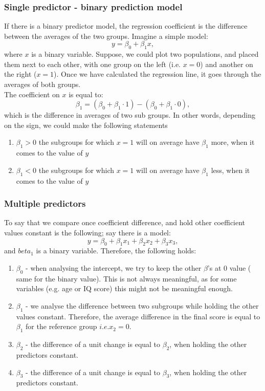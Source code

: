 \documentclass{article}
\begin{document}
\subsubsection*{Single predictor - binary prediction model}
If there is a binary predictor model, the regression coefficient is the difference between the averages of the two groups. Imagine a simple model:
\begin{equation}
y = \beta_0 + \beta_1x,
\end{equation}
\indent
 where $x$ is a binary variable. Suppose, we could plot two populations, and placed them next to each other,  with one group on the left (i.e. $x=0$) and another on the right ($x=1$). Once we have calculated the regression line, it goes through the averages of both groups.
\\
The coefficient on $x$ is equal to:
\begin{equation}
\beta_1 = (\beta_0 + \beta_1 \cdot 1) - (\beta_0 + \beta_1 \cdot 0),
\end{equation}
\indent
 which is the difference in averages of two sub groups. In other words, depending on the sign, we could make the following statements
\begin{enumerate}
\item $\beta_1 > 0$ the subgroups for which $x=1$ will on average have $\beta_1$ more, when it comes to the value of $y$
\item $\beta_1 <0$ the subgroups for which $x=1$ will on average have $\beta_1$ less, when it comes to the value of $y$
\end{enumerate}

\subsubsection*{Multiple predictors}
To say that we compare once coefficient difference, and hold other coefficient values constant is the following; say there is a model:
\begin{equation}
y = \beta_0 + \beta_1x_1 + \beta_2x_2 + \beta_3x_3 ,
\end{equation}
\indent
and $beta_1$ is a binary variable. Therefore, the following holds:
\begin{enumerate}
\item $\beta_0$ - when analysing the intercept, we try to keep the other $\beta$'s at 0 value ( same for the binary value). This is not always meaningful, as for some variables (e.g. age or IQ score) this might not be meaningful enough.
\item $\beta_1$ - we analyse the difference between two subgroups while holding the other values constant. Therefore, the average difference in the final score is equal to $\beta_1$ for the reference group $i.e. x_2=0$.
\item $\beta_2$ - the difference of a unit change is equal to $\beta_2$, when holding the other predictors constant.
\item $\beta_3$ - the difference of a unit change is equal to $\beta_3$, when holding the other predictors constant.
\end{enumerate}
\end{document}
